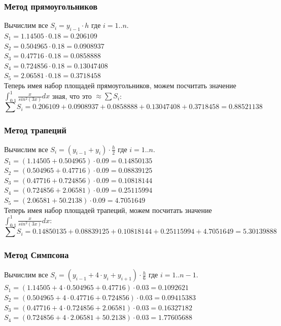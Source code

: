 \documentclass{article}
\begin{document}
\subsubsection{Метод прямоугольников}
Вычислим все $S_{i} = y_{i-1} \cdot h$ где $i = 1..n$. \\
$S_{1} =  1.14505 \cdot 0.18 = 0.206109$ \\
$S_{2} =  0.504965 \cdot 0.18 = 0.0908937$ \\
$S_{3} =  0.47716 \cdot 0.18 = 0.0858888$ \\
$S_{4} =  0.724856 \cdot 0.18 = 0.13047408$\\
$S_{5} =  2.06581 \cdot 0.18 = 0.3718458$\\

Теперь имея набор площадей прямоугольников, можем посчитать значение 
$\int_{0.1}^1 \frac{x}{sin^2(3x)}dx$ зная, что это  $\approx \sum S_{i}$: \\
\begin{displaymath} 
  \sum S_{i} = 0.206109 + 0.0908937 + 0.0858888 + 0.13047408 + 0.3718458 =
  0.88521138
\end{displaymath}

\subsubsection{Метод трапеций}\label{integ_trapezoid}
Вычислим все $S_{i} = (y_{i-1} + y_{i}) \cdot \frac{h}{2}$ где $i = 1..n$. \\
$S_{1} = (1.14505 + 0.504965 ) \cdot 0.09 = 0.14850135$\\
$S_{2} = (0.504965 + 0.47716 ) \cdot 0.09 = 0.08839125$\\
$S_{3} = (0.47716 + 0.724856 ) \cdot 0.09 = 0.10818144$\\
$S_{4} = (0.724856 + 2.06581 ) \cdot 0.09 = 0.25115994$\\
$S_{5} = (2.06581 +  50.2138 )  \cdot 0.09 = 4.7051649$\\

Теперь имея набор площадей трапеций, можем посчитать значение  
$\int_{0.1}^1 \frac{x}{sin^2(3x)}dx$:\\
\begin{displaymath} 
  \sum S_{i} = 0.14850135 + 0.08839125 + 0.10818144 + 0.25115994 + 4.7051649 =
  5.30139888
\end{displaymath}

\subsubsection{Метод Симпсона}
Вычислим все $S_{i} = (y_{i-1} + 4 \cdot y_{i} + y_{i+1}) \cdot \frac{h}{6}$ где
$i = 1..n-1$. \\
$S_{1} = (1.14505 + 4 \cdot 0.504965 + 0.47716) \cdot 0.03 = 0.1092621$\\
$S_{2} = (0.504965 + 4 \cdot 0.47716 + 0.724856) \cdot 0.03 = 0.09415383$\\
$S_{3} = (0.47716 + 4 \cdot 0.724856 + 2.06581) \cdot 0.03 = 0.16327182$\\
$S_{4} = (0.724856 + 4 \cdot 2.06581 + 50.2138) \cdot 0.03 = 1.77605688$\\
\end{document}
